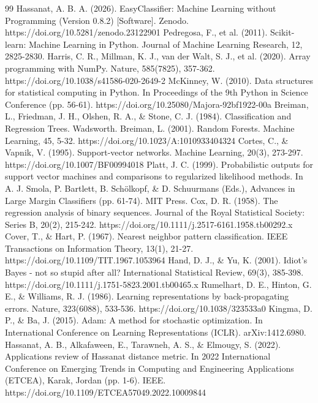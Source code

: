 \documentclass[11pt,a4paper]{article}
\begin{document}
\begin{thebibliography}{99}
 Hassanat, A. B. A. (2026). EasyClassifier: Machine Learning without Programming (Version 0.8.2) [Software]. Zenodo. https://doi.org/10.5281/zenodo.23122901
 Pedregosa, F., et al. (2011). Scikit-learn: Machine Learning in Python. Journal of Machine Learning Research, 12, 2825-2830.
 Harris, C. R., Millman, K. J., van der Walt, S. J., et al. (2020). Array programming with NumPy. Nature, 585(7825), 357-362. https://doi.org/10.1038/s41586-020-2649-2
 McKinney, W. (2010). Data structures for statistical computing in Python. In Proceedings of the 9th Python in Science Conference (pp. 56-61). https://doi.org/10.25080/Majora-92bf1922-00a
 Breiman, L., Friedman, J. H., Olshen, R. A., \& Stone, C. J. (1984). Classification and Regression Trees. Wadsworth.
 Breiman, L. (2001). Random Forests. Machine Learning, 45, 5-32. https://doi.org/10.1023/A:1010933404324
 Cortes, C., \& Vapnik, V. (1995). Support-vector networks. Machine Learning, 20(3), 273-297. https://doi.org/10.1007/BF00994018
 Platt, J. C. (1999). Probabilistic outputs for support vector machines and comparisons to regularized likelihood methods. In A. J. Smola, P. Bartlett, B. Schölkopf, \& D. Schuurmans (Eds.), Advances in Large Margin Classifiers (pp. 61-74). MIT Press.
 Cox, D. R. (1958). The regression analysis of binary sequences. Journal of the Royal Statistical Society: Series B, 20(2), 215-242. https://doi.org/10.1111/j.2517-6161.1958.tb00292.x
 Cover, T., \& Hart, P. (1967). Nearest neighbor pattern classification. IEEE Transactions on Information Theory, 13(1), 21-27. https://doi.org/10.1109/TIT.1967.1053964
 Hand, D. J., \& Yu, K. (2001). Idiot's Bayes - not so stupid after all? International Statistical Review, 69(3), 385-398. https://doi.org/10.1111/j.1751-5823.2001.tb00465.x
 Rumelhart, D. E., Hinton, G. E., \& Williams, R. J. (1986). Learning representations by back-propagating errors. Nature, 323(6088), 533-536. https://doi.org/10.1038/323533a0
 Kingma, D. P., \& Ba, J. (2015). Adam: A method for stochastic optimization. In International Conference on Learning Representations (ICLR). arXiv:1412.6980.
 Hassanat, A. B., Alkafaween, E., Tarawneh, A. S., \& Elmougy, S. (2022). Applications review of Hassanat distance metric. In 2022 International Conference on Emerging Trends in Computing and Engineering Applications (ETCEA), Karak, Jordan (pp. 1-6). IEEE. https://doi.org/10.1109/ETCEA57049.2022.10009844

\end{thebibliography}
\end{document}
